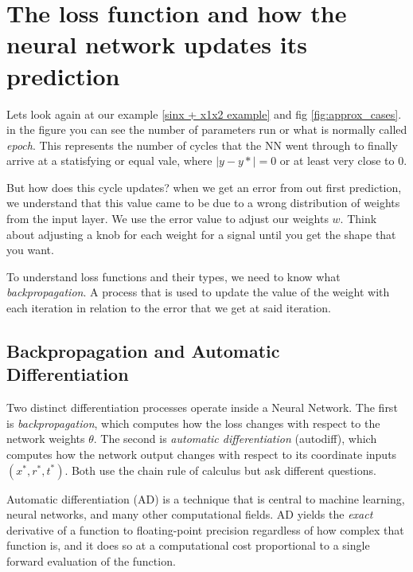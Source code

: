 \documentclass[12pt, a4paper]{article}
\begin{document}
\section{The loss function and how the neural network updates its prediction}

Lets look again at our example \ref{sinx + x1x2 example} and fig \ref{fig:approx_cases}. in the figure you can see the number of parameters run or what is normally called \textit{epoch}. This represents the number of cycles that the NN went through to finally arrive at a statisfying or equal vale, where $|y - y*| = 0 $ or at least very close to 0. 

But how does this cycle updates? when we get an error from out first prediction, we understand that this value came to be due to a wrong distribution of weights from the input layer. We use the error value to adjust our weights $w$. Think about adjusting a knob for each weight for a signal until you get the shape that you want. 

To understand loss functions and their types, we need to know what \textit{backpropagation}. A process that is used to update the value of the weight with each iteration in relation to the error that we get at said iteration.
\subsection{Backpropagation and Automatic Differentiation}
\label{sec:autodiff}

Two distinct differentiation processes operate inside a Neural Network. The first is
\emph{backpropagation}, which computes how the loss changes with respect to the
network weights $\theta$. The second is \emph{automatic differentiation} (autodiff),
which computes how the network output changes with respect to its coordinate inputs
$(x^*, r^*, t^*)$. Both use the chain rule of calculus but ask different questions.\citep{rumelhart1986}



Automatic differentiation (AD) is a technique that is central to machine
learning, neural networks, and many other computational fields.
AD yields the \emph{exact} derivative of a function  to floating-point
precision regardless of how complex that function is, and it does so at a
computational cost proportional to a single forward evaluation of the
function.
\end{document}
